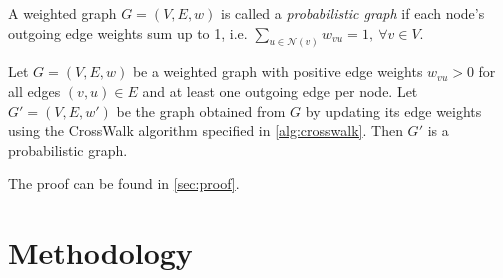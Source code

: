 

\begin{definition}
\label{def:probgraph}
A weighted graph $G = (V, E, w)$ is called a \textit{probabilistic graph} if each node's outgoing edge weights sum up to 1, i.e. $\sum_{u \in \mathcal{N}(v)} w_{vu} = 1, \ \forall v \in V$.
\end{definition}

\begin{theorem}
\label{th:theorem1}
Let $G = (V, E, w)$ be a weighted graph with positive edge weights $w_{vu} > 0$ for all edges $(v, u) \in E$ and at least one outgoing edge per node. Let $G' = (V, E, w')$ be the graph obtained from $G$ by updating its edge weights using the CrossWalk algorithm specified in \autoref{alg:crosswalk}. Then $G'$ is a probabilistic graph. 
\end{theorem}
The proof can be found in \autoref{sec:proof}.




\section{Methodology}
\label{sec:methodology}


